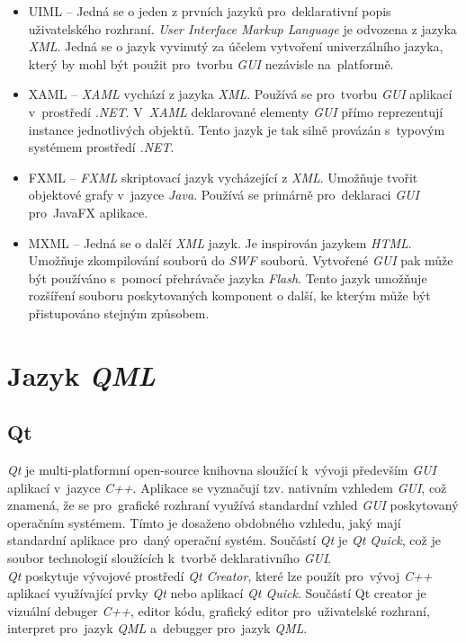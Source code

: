 \documentclass[11pt,twoside,a4paper]{book}
\begin{document}
\begin{itemize}
\item UIML – Jedná se o jeden z prvních jazyků pro~deklarativní popis uživatelského rozhraní. \textit{User Interface Markup Language} je odvozena z jazyka \textit{XML}. Jedná se o jazyk vyvinutý za účelem vytvoření univerzálního jazyka, který by mohl být použit pro~tvorbu \textit{GUI} nezávisle na~platformě. \cite{bib:UIML}
\item XAML – \textit{XAML} vychází z jazyka \textit{XML}. Používá se pro~tvorbu \textit{GUI} aplikací v~prostředí \textit{.NET}. V~\textit{XAML} deklarované elementy \textit{GUI} přímo reprezentují instance jednotlivých objektů. Tento jazyk je tak silně provázán s~typovým systémem prostředí \textit{.NET}. \cite{bib:XAML}
\item FXML – \textit{FXML} skriptovací jazyk vycházející z \textit{XML}. Umožňuje tvořit objektové grafy v~jazyce \textit{Java}. Používá se primárně pro~deklaraci \textit{GUI} pro~JavaFX aplikace.\cite{bib:FXML}
\item MXML – Jedná se o dalčí \textit{XML} jazyk. Je inspirován jazykem \textit{HTML}. Umožňuje zkompilování souborů do \textit{SWF} souborů. Vytvořené \textit{GUI} pak může být používáno s~pomocí přehrávače jazyka \textit{Flash}. Tento jazyk umožňuje rozšíření souboru poskytovaných komponent o další, ke kterým může být přistupováno stejným způsobem.\cite{bib:MXML}
\end{itemize}


\section{\label{SEC:QML}Jazyk \textit{QML}}
\subsection{Qt}
\textit{Qt} je multi-platformní open-source knihovna sloužící k~vývoji především \textit{GUI} aplikací v~jazyce \textit{C++}. Aplikace se vyznačují tzv. nativním vzhledem \textit{GUI}, což znamená, že se pro~grafické rozhraní využívá standardní vzhled \textit{GUI} poskytovaný operačním systémem. Tímto je dosaženo obdobného vzhledu, jaký mají standardní aplikace pro~daný operační systém. Součástí \textit{Qt} je \textit{Qt Quick}, což je soubor technologií sloužících k~tvorbě deklarativního \textit{GUI}.\\
\textit{Qt} poskytuje vývojové prostředí \textit{Qt Creator}, které lze použít pro~vývoj \textit{C++} aplikací využívající prvky \textit{Qt} nebo aplikací \textit{Qt Quick}. Součástí Qt creator je vizuální debuger \textit{C++}, editor kódu, grafický editor pro~uživatelské rozhraní, interpret pro~jazyk \textit{QML} a~debugger pro~jazyk \textit{QML}. \cite{bib:QtCreator}
\end{document}
